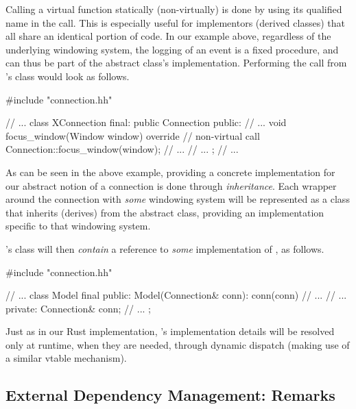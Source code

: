 Calling a virtual function statically (non-virtually) is done by using its
qualified name in the call. This is especially useful for implementors (derived
classes) that all share an identical portion of code. In our example above,
regardless of the underlying windowing system, the logging of an event is a
fixed procedure, and can thus be part of the abstract class's implementation.
Performing the call from \wmcpp's  class would look as
follows.

\begin{cppblock}
  #include "connection.hh"

  // ...
  class XConnection final: public Connection
  {
  public:
    // ...
    void focus_window(Window window) override {
      // non-virtual call
      Connection::focus_window(window);
      // ...
    }
    // ...
  };
  // ...
\end{cppblock}

As can be seen in the above example, providing a concrete implementation for
our abstract notion of a connection is done through \textit{inheritance}.
Each wrapper around the connection with \textit{some} windowing system will
be represented as a class that inherits (derives) from the 
abstract class, providing an implementation specific to that windowing system.

\wmcpp's  class will then \textit{contain} a reference to
\textit{some} implementation of , as follows.

\begin{cppblock}
  #include "connection.hh"

  // ...
  class Model final
  {
  public:
    Model(Connection& conn): conn(conn) {
      // ...
    }
    // ...
  private:
    Connection& conn;
    // ...
  };
\end{cppblock}

Just as in our Rust implementation, 's implementation details will
be resolved only at runtime, when they are needed, through dynamic dispatch
(making use of a similar vtable mechanism).


\subsection{External Dependency Management: Remarks}

